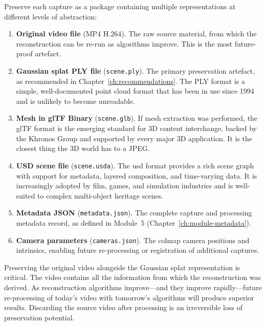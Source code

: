 Preserve each capture as a package containing multiple representations at different levels of abstraction:

\begin{enumerate}
  \item \textbf{Original video file} (MP4 H.264). The raw source material, from which the reconstruction can be re-run as algorithms improve. This is the most future-proof artefact.

  \item \textbf{Gaussian splat PLY file} (\texttt{scene.ply}). The primary preservation artefact, as recommended in Chapter~\ref{ch:recommendations}. The PLY format is a simple, well-documented point cloud format that has been in use since 1994 and is unlikely to become unreadable.

  \item \textbf{Mesh in glTF Binary} (\texttt{scene.glb}). If mesh extraction was performed, the glTF format is the emerging standard for 3D content interchange, backed by the Khronos Group and supported by every major 3D application. It is the closest thing the 3D world has to a JPEG.

  \item \textbf{USD scene file} (\texttt{scene.usda}). The \acrlong{usd} format provides a rich scene graph with support for metadata, layered composition, and time-varying data. It is increasingly adopted by film, games, and simulation industries and is well-suited to complex multi-object heritage scenes.

  \item \textbf{Metadata JSON} (\texttt{metadata.json}). The complete capture and processing metadata record, as defined in Module~5 (Chapter~\ref{ch:module-metadata}).

  \item \textbf{Camera parameters} (\texttt{cameras.json}). The \acrshort{colmap} camera positions and intrinsics, enabling future re-processing or registration of additional captures.
\end{enumerate}

\begin{keyfinding}
Preserving the original video alongside the Gaussian splat representation is critical. The video contains all the information from which the reconstruction was derived. As reconstruction algorithms improve---and they improve rapidly---future re-processing of today's video with tomorrow's algorithms will produce superior results. Discarding the source video after processing is an irreversible loss of preservation potential.
\end{keyfinding}

